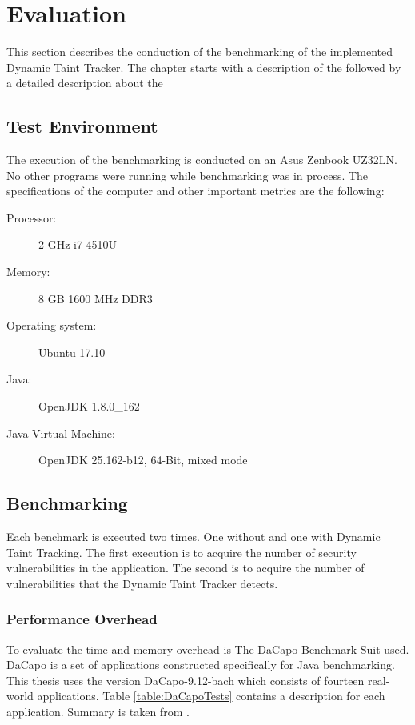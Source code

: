 \chapter{Evaluation}
This section describes the conduction of the benchmarking of the implemented Dynamic Taint Tracker. The chapter starts with a description of the \textit{} followed by a detailed description about the \textit{}

\section{Test Environment}
\label{TestEnvironment}
The execution of the benchmarking is conducted on an Asus Zenbook UZ32LN. No other programs were running while benchmarking was in process. The specifications of the computer and other important metrics are the following:

\begin{description}
    \item [Processor:] 2 GHz i7-4510U
    \item [Memory:] 8 GB 1600 MHz DDR3
    \item [Operating system:] Ubuntu 17.10
    \item [Java:] OpenJDK 1.8.0\_162
    \item [Java Virtual Machine:] OpenJDK 25.162-b12, 64-Bit, mixed mode
\end{description}



\section{Benchmarking}
\label{Benchmarking}
Each benchmark is executed two times. One without and one with Dynamic Taint Tracking. The first execution is to acquire the number of security vulnerabilities in the application. The second is to acquire the number of vulnerabilities that the Dynamic Taint Tracker detects.



\subsection{Performance Overhead}
To evaluate the time and memory overhead is The DaCapo Benchmark Suit \parencite{dacapo} used. DaCapo is a set of applications constructed specifically for Java benchmarking. This thesis uses the version DaCapo-9.12-bach which consists of fourteen real-world applications. Table \ref{table:DaCapoTests} contains a description for each application. Summary is taken from \textcite{dacapoBench}.

